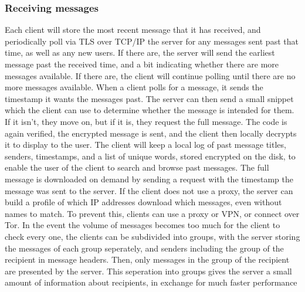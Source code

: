 \documentclass{article}
\begin{document}
\subsubsection{Receiving messages}
Each client will store the most recent message that it has received, and periodically poll via TLS over TCP/IP the server for any messages sent past that time, as well as any new users. If there are, the server will send the earliest message past the received time, and a bit indicating whether there are more messages available. If there are, the client will continue polling until there are no more messages available. When a client polls for a message, it sends the timestamp it wants the messages past. The server can then send a small snippet which the client can use to determine whether the message is intended for them. If it isn't, they move on, but if it is, they request the full message. The code is again verified, the encrypted message is sent, and the client then locally decrypts it to display to the user. The client will keep a local log of past message titles, senders, timestamps, and a list of unique words, stored encrypted on the disk, to enable the user of the client to search and browse past messages. The full message is downloaded on demand by sending a request with the timestamp the message was sent to the server. If the client does not use a proxy, the server can build a profile of which IP addresses download which messages, even without names to match. To prevent this, clients can use a proxy or VPN, or connect over Tor. In the event the volume of messages becomes too much for the client to check every one, the clients can be subdivided into groups, with the server storing the messages of each group seperately, and senders including the group of the recipient in message headers. Then, only messages in the group of the recipient are presented by the server. This seperation into groups gives the server a small amount of information about recipients, in exchange for much faster performance
\end{document}
